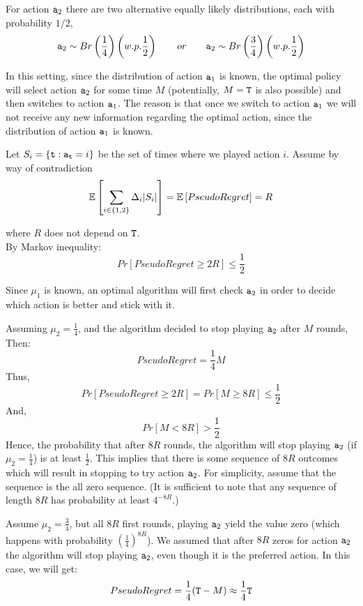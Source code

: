 For action ${\tt a}_2$ there are two alternative equally likely  distributions, each with probability $1/2$,
\[
{\tt a}_{2}\sim Br\left(\frac{1}{4}\right) \left(w.p. \frac{1}{2}\right)
\qquad or \qquad {\tt a}_{2}\sim Br\left(\frac{3}{4}\right) \left(w.p.
\frac{1}{2}\right)
\]

In this setting, since the distribution of action ${\tt a}_1$ is known, the optimal policy will select action ${\tt a}_2$ for some time $M$ (potentially, $M={\tt T}$ is also possible) and then switches to action ${\tt a}_1$. The reason is that once we switch to action ${\tt a}_1$ we will not receive any new information regarding the optimal action, since the distribution of action ${\tt a}_1$ is known. 

Let $S_i=\{{\tt t}:{\tt a}_{\tt t}=i\}$ be the set of times where we played action $i$. 
Assume by way of contradiction
\[
\mathbb{E}\left[ \sum_{i \in \{1,2\}} \Delta_i |S_i|\right] = \mathbb{E}\left[Pseudo Regret\right]=R
\]

where $R$ does not depend on ${\tt T}$. \\ By Markov inequality:
\[
Pr\left[Pseudo Regret\ge2R\right]\le\frac{1}{2}
\]

Since $\mu_1$ is known, an optimal algorithm will first check ${\tt a}_2$
in order to decide which action is better and stick with it.

Assuming $\mu_2 = \frac{1}{4}$, and the algorithm decided to stop
playing ${\tt a}_2$ after $M$ rounds, Then:
\[
Pseudo Regret = \frac{1}{4}M
\]
Thus,
\[
Pr\left[Pseudo Regret\ge 2R \right] = Pr\left[ M\ge 8R
\right]\le\frac{1}{2}
\]
And,
\[
Pr\left[M < 8R \right]>\frac{1}{2}
\]
Hence, the probability that after $8R$ rounds, the algorithm will
stop playing ${\tt a}_2$ (if $\mu_2 = \frac{1}{4}$) is at least
$\frac{1}{2}$. This implies that there is some sequence of $8R$
outcomes which will result in stopping to try action ${\tt a}_2$. For simplicity, assume that the sequence is the all zero sequence. (It is sufficient to note that any sequence of length $8R$ has probability at least $4^{-8R}$.)


Assume $\mu_2 = \frac{3}{4}$, but all $8R$ first rounds, playing
${\tt a}_2$ yield the value zero (which happens with probability
$\left(\frac{1}{4}\right)^{8R}$). We assumed that after $8R$ zeros
for action ${\tt a}_2$ the algorithm will stop playing ${\tt a}_2$, even though
it is the preferred action. In this case, we will get:
\[
Pseudo Regret = \frac{1}{4} ({\tt T} - M) \approx \frac{1}{4}{\tt T}
\]

